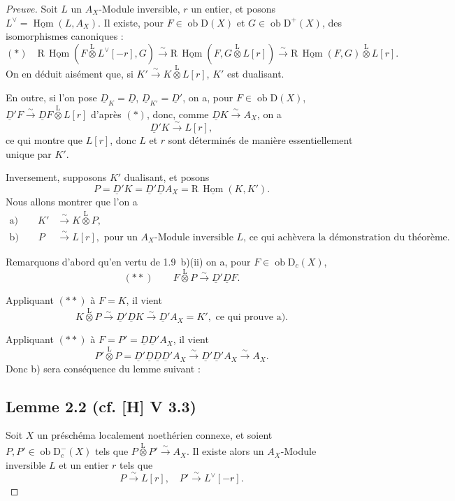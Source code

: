 \documentclass[11pt]{article}
\DeclareMathOperator{\Hom}{Hom}
\newcommand{\R}{\mathrm{R}}
\newcommand{\D}{\mathrm{D}}
\newcommand{\ob}{\operatorname{ob}}
\providecommand{\Hom}{\operatorname{Hom}}
\providecommand{\ob}{\operatorname{ob}}
\providecommand{\R}{\mathrm R}
\providecommand{\Hom}{\operatorname{Hom}}
\begin{document}
\begin{proof}[Preuve]
Soit $L$ un $A_X$-Module inversible, $r$ un entier, et posons $L^{\vee} = \underline{\Hom}(L, A_X)$. Il existe, pour $F \in \ob \D(X)$ et $G \in \ob \D^{+}(X)$, des isomorphismes canoniques :
\[
(*) \quad \R\,\underline{\Hom}(F \mathop{\otimes}\limits^{\mathrm{L}} L^{\vee}[-r], G) \xrightarrow{\sim} \R\,\underline{\Hom}(F, G \mathop{\otimes}\limits^{\mathrm{L}} L[r]) \xrightarrow{\sim} \R\,\underline{\Hom}(F,G) \mathop{\otimes}\limits^{\mathrm{L}} L[r].
\]
On en déduit aisément que, si $K' \xrightarrow{\sim} K \mathop{\otimes}\limits^{\mathrm{L}} L[r]$, $K'$ est dualisant.

En outre, si l'on pose $\underline{D}_K = \underline{D}$, $\underline{D}_{K'} = \underline{D}'$, on a, pour $F \in \ob \D(X)$, $\underline{D}'F \xrightarrow{\sim} \underline{D} F \mathop{\otimes}\limits^{\mathrm{L}} L[r]$ d'après $(*)$, donc, comme $\underline{D} K \xrightarrow{\sim} A_X$, on a
\[
\underline{D}' K \xrightarrow{\sim} L[r],
\]
ce qui montre que $L[r]$, donc $L$ et $r$ sont déterminés de manière essentiellement unique par $K'$.

Inversement, supposons $K'$ dualisant, et posons
\[
P = \underline{D}'K = \underline{D}'\underline{D} A_X = \R\,\underline{\Hom}(K,K').
\]
Nous allons montrer que l'on a
\begin{align*}
\text{a)} \qquad K' &\xrightarrow{\sim} K \mathop{\otimes}\limits^{\mathrm{L}} P, \\
\text{b)} \qquad P &\xrightarrow{\sim} L[r], \text{ pour un $A_X$-Module inversible $L$, ce qui achèvera la démonstration du théorème.}
\end{align*}

Remarquons d'abord qu'en vertu de 1.9~b)(ii) on a, pour $F \in \ob \D_c(X)$,
\[
(**) \qquad F \mathop{\otimes}\limits^{\mathrm{L}} P \xrightarrow{\sim} \underline{D}'\underline{D} F.
\]

Appliquant $(**)$ à $F = K$, il vient
\[
K \mathop{\otimes}\limits^{\mathrm{L}} P \xrightarrow{\sim} \underline{D}'\underline{D} K \xrightarrow{\sim} \underline{D}' A_X = K', \text{ ce qui prouve a).}
\]

Appliquant $(**)$ à $F = P' = \underline{D}\underline{D}'A_X$, il vient
\[
P' \mathop{\otimes}\limits^{\mathrm{L}} P = \underline{D}'\underline{D}\underline{D}\underline{D}'A_X \xrightarrow{\sim} \underline{D}'\underline{D}'A_X \xrightarrow{\sim} A_X.
\]
Donc b) sera conséquence du lemme suivant :

\subsection*{Lemme 2.2 (cf. [H] V 3.3)}
Soit $X$ un préschéma localement noethérien connexe, et soient $P, P' \in \ob \D_c^{-}(X)$ tels que $P \mathop{\otimes}\limits^{\mathrm{L}} P' \xrightarrow{\sim} A_X$. Il existe alors un $A_X$-Module inversible $L$ et un entier $r$ tels que
\[
P \xrightarrow{\sim} L[r], \quad P' \xrightarrow{\sim} L^{\vee}[-r].
\]


\end{proof}
\end{document}

